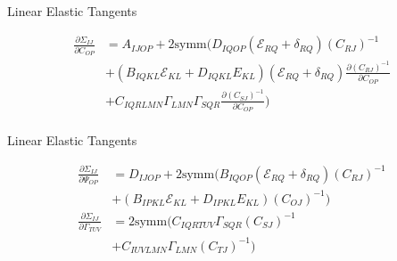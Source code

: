 \documentclass[11pt]{beamer}
\begin{document}
\begin{frame}{Linear Elastic Tangents}


\begin{align*}
\frac{\partial \Sigma_{IJ}}{\partial C_{OP}} &= A_{IJOP} + 2\text{symm}\bigg(D_{IQOP}\left(\mathcal{E}_{RQ} + \delta_{RQ}\right)\left(C_{RJ}\right)^{-1}\\
& + \left(B_{IQKL} \mathcal{E}_{KL} + D_{IQKL} E_{KL}\right)\left(\mathcal{E}_{RQ} + \delta_{RQ}\right) \frac{\partial \left(C_{RJ}\right)^{-1}}{\partial C_{OP}}\\
&+ C_{IQRLMN} \Gamma_{LMN} \Gamma_{SQR} \frac{\partial \left(C_{SJ}\right)^{-1}}{\partial C_{OP}}\bigg)\\
\end{align*}

\end{frame}

\begin{frame}{Linear Elastic Tangents}

\begin{align*}
\frac{\partial \Sigma_{IJ}}{\partial \Psi_{OP}} &= D_{IJOP} + 2\text{symm}\bigg(B_{IQOP} \left(\mathcal{E}_{RQ} + \delta_{RQ}\right) \left(C_{RJ}\right)^{-1}\\
&+ \left(B_{IPKL}\mathcal{E}_{KL} + D_{IPKL}E_{KL}\right)\left(C_{OJ}\right)^{-1}\bigg)\\
\frac{\partial \Sigma_{IJ}}{\partial \Gamma_{TUV}} &= 2\text{symm}\bigg(C_{IQRTUV} \Gamma_{SQR} \left(C_{SJ}\right)^{-1}\\
&+ C_{IUVLMN} \Gamma_{LMN} \left(C_{TJ}\right)^{-1}\bigg)\\
\end{align*}

\end{frame}
\end{document}
